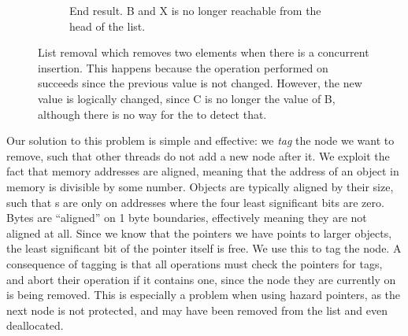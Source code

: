 \documentclass[b5paper]{report}
\begin{document}
\begin{figure}[ht]
  \begin{subfigure}[b]{\textwidth}
      \centering
      \caption{End result. B and X is no longer reachable from the head of the
        list.\label{fig:list-remove-c}}
  \end{subfigure}
  \caption{List removal which removes two elements when there is a concurrent
  insertion. This happens because the  operation
  performed on  succeeds since the previous value is not changed.
  However, the new value is logically changed, since C is no longer the
   value of B, although there is no way for the  to detect
  that.\label{fig:list-remove}}
\end{figure}

Our solution to this problem is simple and effective: we \emph{tag} the node we
want to remove, such that other threads do not add a new node after it. We
exploit the fact that memory addresses are aligned, meaning that the address of
an object in memory is divisible by some number. Objects are typically aligned
by their size, such that s are only on addresses where the four least
significant bits are zero. Bytes are ``aligned'' on 1 byte boundaries,
effectively meaning they are not aligned at all. Since we know that the pointers
we have points to larger objects, the least significant bit of the pointer
itself is free. We use this to tag the node. A consequence of tagging is that
all operations must check the  pointers for tags, and abort their
operation if it contains one, since the node they are currently on is being
removed. This is especially a problem when using hazard pointers, as the next
node is not protected, and may have been removed from the list and even
deallocated.
\end{document}
